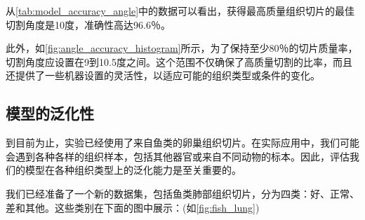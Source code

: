 从\autoref{tab:model_accuracy_angle}中的数据可以看出，获得最高质量组织切片的最佳切割角度是10度，准确性高达96.6％。

此外，如\autoref{fig:angle_accuracy_histogram}所示，为了保持至少80％的切片质量率，切割角度应设置在9到10.5度之间。这个范围不仅确保了高质量切割的比率，而且还提供了一些机器设置的灵活性，以适应可能的组织类型或条件的变化。

\subsection{模型的泛化性}

到目前为止，实验已经使用了来自鱼类的卵巢组织切片。在实际应用中，我们可能会遇到各种各样的组织样本，包括其他器官或来自不同动物的标本。因此，评估我们的模型在各种组织类型上的泛化能力是至关重要的。

我们已经准备了一个新的数据集，包括鱼类肺部组织切片，分为四类：好、正常、差和其他。这些类别在下面的图中展示：(如\autoref{fig:fish_lung})

